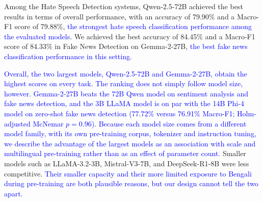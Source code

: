 \documentclass[10pt,letterpaper]{article}
\newcommand{\rev}[1]{\textcolor{blue}{#1}}
\begin{document}
Among the Hate Speech Detection systems, Qwen-2.5-72B achieved the best results in terms of overall performance, with an accuracy of 79.90\% and a Macro-F1 score of 79.88\%, \rev{the strongest hate speech classification performance among the evaluated models}. We achieved the best accuracy of 84.45\% and a Macro-F1 score of 84.33\% in Fake News Detection on Gemma-2-27B, \rev{the best fake news classification performance in this setting}.

\rev{Overall, the two largest models, Qwen-2.5-72B and Gemma-2-27B, obtain the highest scores on every task. The ranking does not simply follow model size, however. Gemma-2-27B beats the 72B Qwen model on sentiment analysis and fake news detection, and the 3B LLaMA model is on par with the 14B Phi-4 model on zero-shot fake news detection (77.72\% versus 76.91\% Macro-F1; Holm-adjusted McNemar $p = 0.96$). Because each model size comes from a different model family, with its own pre-training corpus, tokenizer and instruction tuning, we describe the advantage of the largest models as an association with scale and multilingual pre-training rather than as an effect of parameter count.} Smaller models such as LLaMA-3.2-3B, Mistral-V3-7B, and DeepSeek-R1-8B were less competitive. \rev{Their smaller capacity and their more limited exposure to Bengali during pre-training are both plausible reasons, but our design cannot tell the two apart.}
\end{document}
